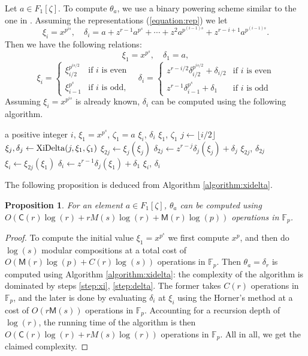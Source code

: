 \documentclass[12pt]{article}
\theoremstyle{plain}
\newtheorem{proposition}[theorem]{Proposition}
\theoremstyle{definition}
\def\F{\mathbb{F}}
\def\M{\mathsf{M}}
\def\CC{\mathsf{C}}
\newcounter{algorithm}
\begin{document}
Let $a \in F_1[\zeta]$. To compute $\theta_a$, we use a binary powering scheme similar to the one in \cite{doliskanischost2011}. Assuming the representations (\ref{equation:rep}) we let 
\[
\xi_i = x^{p^{is}}, \quad
\delta_i = a + z^{r - 1}a^{p^s} + \cdots + z^2a^{p^{(i - 1)s}} + z^{r - i + 1} a^{p^{(i - 1)s}}.
\]
Then we have the following relations:
\[\xi_1 = x^{p^s}, \quad \delta_1 = a, \]
\[
\xi_i =
\begin{cases}
\xi_{i / 2}^{p^{is / 2}} & \text{if $i$ is even}  \\
\xi_{i - 1}^{p^s} & \text{if $i$ is odd,}
\end{cases} \quad
\delta_i=
\begin{cases}
	z^{r - i / 2}\delta_{i / 2}^{p^{is / 2}} + \delta_{i / 2} & \text{if $i$ is even} \\
	z^{r - 1}\delta_{i - 1}^{p^s} + \delta_1 & \text{if $i$ is odd}
\end{cases}
\]
Assuming $\xi_i = x^{p^{is}}$ is already known, $\delta_i$ can be computed using the following algorithm.

\begin{algorithm}
\label{algorithm:xidelta}
	\begin{algorithmic}[1]
		\REQUIRE a positive integer $i$, $\xi_1 = x^{p^s}$, $\zeta_1 = a$
		\ENSURE $\xi_i$, $\delta_i$
			\RETURN $\xi_1$, $\zeta_1$
		\ENDIF
		\STATE $j \leftarrow \lfloor i/2\rfloor$
		\STATE $\xi_{j}, \delta_j \leftarrow {\rm XiDelta}(j,\xi_1,\zeta_1)$ 
		\STATE\label{step:xi} $\xi_{2j} \leftarrow \xi_j(\xi_j)$
		\STATE\label{step:delta} $\delta_{2j} \leftarrow z^{r - j}\delta_j(\xi_j) + \delta_j$
			\RETURN $\xi_{2j}$, $\delta_{2j}$
		\ENDIF
		\STATE $\xi_i \leftarrow \xi_{2j}(\xi_1)$
		\STATE $\delta_i \leftarrow z^{r - 1}\delta_j(\xi_1) + \delta_1$
		\RETURN $\xi_i$, $\delta_i$
	\end{algorithmic}
\end{algorithm}

The following proposition is deduced from Algorithm \ref{algorithm:xidelta}.
\begin{proposition}
\label{proposition:XiDelta}
	For an element $a \in F_1[\zeta]$, $\theta_a$ can be computed using $O(\CC(r)\log(r) + rM(s)\log(r) + \M(r)\log(p))$ operations in $\F_p$.
\end{proposition}
\begin{proof}
	To compute the initial value $\xi_1 = x^{p^s}$ we first compute $x^p$, and then do $\log(s)$ modular compositions at a total cost of $O(\M(r)\log(p) + C(r)\log(s))$ operations in $\F_p$. Then $\theta_a = \delta_r$ is computed using Algorithm \ref{algorithm:xidelta}: the complexity of the algorithm is dominated by steps \ref{step:xi}, \ref{step:delta}. The former takes $C(r)$ operations in $\F_p$, and the later is done by evaluating $\delta_i$ at $\xi_i$ using the Horner's method at a cost of $O(r\M(s))$ operations in $\F_p$. Accounting for a recursion depth of $\log(r)$, the running time of the algorithm is then $O(\CC(r)\log(r) + rM(s)\log(r))$ operations in $\F_p$. All in all, we get the claimed complexity.
\end{proof}
\end{document}
